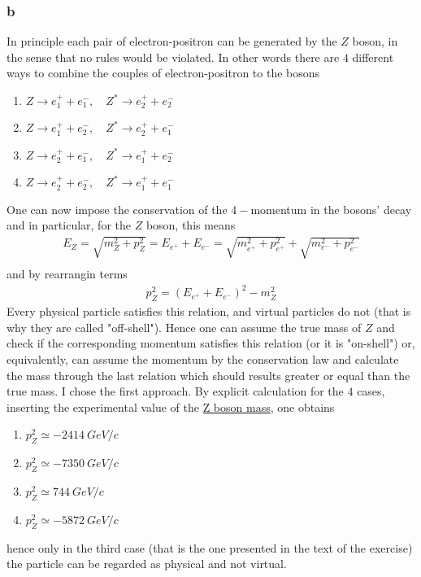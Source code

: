 \subsubsection*{b}
In principle each pair of electron-positron can be generated by the $Z$ boson, in the sense that no rules would be violated. 
In other words there are $4$ different ways to combine the couples of electron-positron to the bosons
\begin{enumerate}
    \item $Z \rightarrow e^+_1 + e^-_1, \quad Z^* \rightarrow e^+_2 + e^-_2$
    \item $Z \rightarrow e^+_1 + e^-_2, \quad Z^* \rightarrow e^+_2 + e^-_1$ 
    \item $Z \rightarrow e^+_2 + e^-_1, \quad Z^* \rightarrow e^+_1 + e^-_2$
    \item $Z \rightarrow e^+_2 + e^-_2, \quad Z^* \rightarrow e^+_1 + e^-_1$
\end{enumerate}
One can now impose the conservation of the $4-$momentum in the bosons' decay and in particular, for the $Z$ boson, this means 
\begin{gather*}
    E_Z = \sqrt{m_Z^2 + p_Z^2} = E_{e^+} + E_{e^-} = \sqrt{m_{e^+}^2 + p_{e^+}^2} + \sqrt{m_{e^-}^2 + p_{e^-}^2} \\
\end{gather*}
and by rearrangin terms
\begin{gather*}
    p_Z^2 = (E_{e^+} + E_{e^-})^2 - m_Z^2
\end{gather*}
Every physical particle satisfies this relation, and virtual particles do not (that is why they are called "off-shell"). Hence one can assume the true mass of $Z$ and check if the corresponding 
momentum satisfies this relation (or it is "on-shell") or, equivalently, can assume the momentum by the conservation law and calculate the mass through the last relation 
which should results greater or equal than the true mass. I chose the first approach.
By explicit calculation for the $4$ cases, inserting the experimental value of the \href{https://en.wikipedia.org/wiki/W_and_Z_bosons}{Z boson mass}, one obtains 
\begin{enumerate}
    \item $p_Z^2 \simeq -2414~GeV/c$
    \item $p_Z^2 \simeq -7350~GeV/c$
    \item $p_Z^2 \simeq 744~GeV/c$
    \item $p_Z^2 \simeq  -5872~GeV/c$
\end{enumerate}
hence only in the third case (that is the one presented in the text of the exercise) the particle can be regarded as physical and not virtual.

